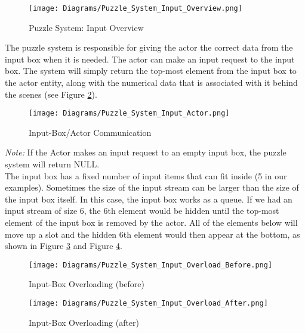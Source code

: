 \begin{figure}[!hb]
  \caption{Puzzle System: Input Overview}
  \label{fig:Puzzle_System_Input_Overview}
  \centering
  \texttt{[image: Diagrams/Puzzle\_System\_Input\_Overview.png]}
\end{figure}
\vfill
\clearpage

The puzzle system is responsible for giving the actor the correct data from the
input box when it is needed. The actor can make an input request to the input box.
The system will simply return the top-most element from the input box to the actor entity, along with the
numerical data that is associated with it behind the scenes (see Figure \ref{fig:Puzzle_System_Input_Actor}).\\

\begin{figure}[!hb]
  \caption{Input-Box/Actor Communication}
  \label{fig:Puzzle_System_Input_Actor}
  \centering
  \texttt{[image: Diagrams/Puzzle\_System\_Input\_Actor.png]}
\end{figure}

\textit{Note:} If the Actor makes an input request to an empty input box, the puzzle system
will return NULL.\\

The input box has a fixed number of input items that can fit inside (5 in our examples).
Sometimes the size of the input stream can be larger than the size of the input box
itself. In this case, the input box works as a queue. If we had an input stream of
size 6, the 6th element would be hidden until the top-most element of the input box
is removed by the actor. All of the elements below will move up a slot and the
hidden 6th element would then appear at the bottom, as shown in Figure \ref{fig:Puzzle_System_Input_Overload_Before} and
Figure \ref{fig:Puzzle_System_Input_Overload_After}.\\

\begin{figure}[!htb]
  \caption{Input-Box Overloading (before)}
  \label{fig:Puzzle_System_Input_Overload_Before}
  \centering
  \texttt{[image: Diagrams/Puzzle\_System\_Input\_Overload\_Before.png]}
\end{figure}

\begin{figure}[!htb]
  \caption{Input-Box Overloading (after)}
  \label{fig:Puzzle_System_Input_Overload_After}
  \centering
  \texttt{[image: Diagrams/Puzzle\_System\_Input\_Overload\_After.png]}
\end{figure}
\vfill
\clearpage

